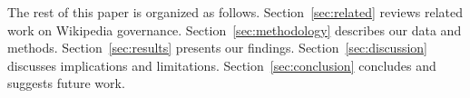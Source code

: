 The rest of this paper is organized as follows. 
Section~\ref{sec:related} reviews related work on Wikipedia governance. 
Section~\ref{sec:methodology} describes our data and methods.
Section~\ref{sec:results} presents our findings.
Section~\ref{sec:discussion} discusses implications and limitations.
Section~\ref{sec:conclusion} concludes and suggests future work.

